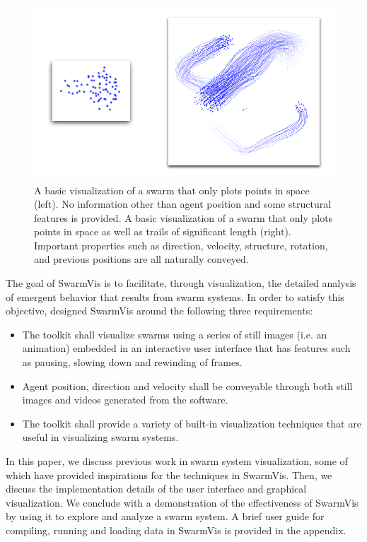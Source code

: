 \documentclass[conference]{IEEEtran}
\begin{document}
\begin{figure}
\centering
\includegraphics[scale=.55]{images/intro.pdf}
\caption{A basic visualization of a swarm that only plots points in space (left).
No information other than agent position and some structural features is provided.
A basic visualization of a swarm that only plots points in space as well as trails of significant length (right).
Important properties such as direction, velocity, structure, rotation,
and previous positions are all naturally conveyed.
}
\label{Intro}
\end{figure}

The goal of SwarmVis is to facilitate, through visualization, the detailed analysis of emergent behavior that results from swarm systems. In order to satisfy this objective, designed SwarmVis around the following three requirements:
\begin{itemize}
\item The toolkit shall visualize swarms using a series of still images (i.e. an animation)
embedded in an interactive user interface that has features such as pausing, slowing down and rewinding of frames.
\item Agent position, direction and velocity shall be conveyable through both still images and videos generated from the software.
\item The toolkit shall provide a variety of built-in visualization techniques that are useful in visualizing swarm systems.
\end{itemize}

In this paper, we discuss previous work in swarm system visualization,
some of which have provided inspirations for the techniques in SwarmVis.
Then, we discuss the implementation details of the user interface and graphical visualization.
We conclude with a demonstration of the effectiveness of SwarmVis by using it to explore and analyze a swarm system.
A brief user guide for compiling, running and loading data in SwarmVis is provided in the appendix.
\end{document}
